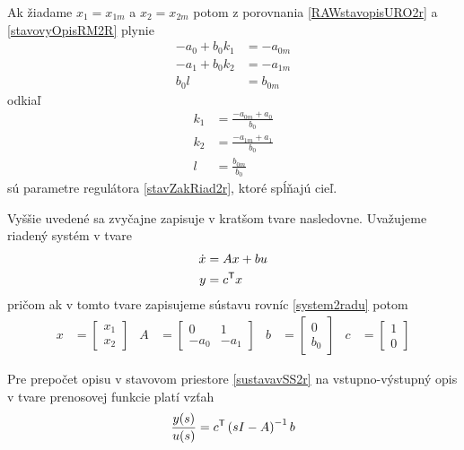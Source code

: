 \documentclass[a4paper, 10pt, ]{article}
\begin{document}
Ak žiadame $x_1 = x_{1m}$ a $x_2 = x_{2m}$ potom z porovnania \eqref{RAWstavopisURO2r} a \eqref{stavovyOpisRM2R} plynie
\begin{subequations}
    \begin{align}
        -a_0 + b_0 k_1 &=  -a_{0m}\\
        -a_1 + b_0 k_2 &=  -a_{1m}\\
        b_0 l &= b_{0m}
    \end{align}
\end{subequations}
odkiaľ
\begin{subequations}
    \begin{align}
        k_1 &= \frac{ -a_{0m} + a_0}{b_0}\\
        k_2 &= \frac{ -a_{1m} + a_1}{b_0}\\
        l &= \frac{b_{0m}}{b_0}
    \end{align}
\end{subequations}
sú parametre regulátora \eqref{stavZakRiad2r}, ktoré spĺňajú cieľ.

Vyššie uvedené sa zvyčajne zapisuje v kratšom tvare nasledovne. Uvažujeme riadený systém v tvare
\begin{subequations} \label{sustavavSS2r}
    \begin{align}
         \dot x &= A x + b u \\
         y &= c^{\mathsf{T}} x
    \end{align}
\end{subequations}
pričom ak v tomto tvare zapisujeme sústavu rovníc \eqref{system2radu} potom
\begin{align*}
    x &= \begin{bmatrix} x_1 \\ x_2 \end{bmatrix}
    &
    A &= \begin{bmatrix} 0 & 1 \\ -a_0 & -a_1 \end{bmatrix}
    &
    b &= \begin{bmatrix} 0 \\ b_0 \end{bmatrix}
    &
    c &= \begin{bmatrix} 1 \\ 0 \end{bmatrix}
\end{align*}

Pre prepočet opisu v stavovom priestore \eqref{sustavavSS2r} na vstupno-výstupný opis v tvare prenosovej funkcie platí vzťah
\begin{equation}
    \frac{y(s)}{u(s)} = c^{\mathsf{T}} \left( s I - A \right)^{-1} b
\end{equation}
\end{document}
